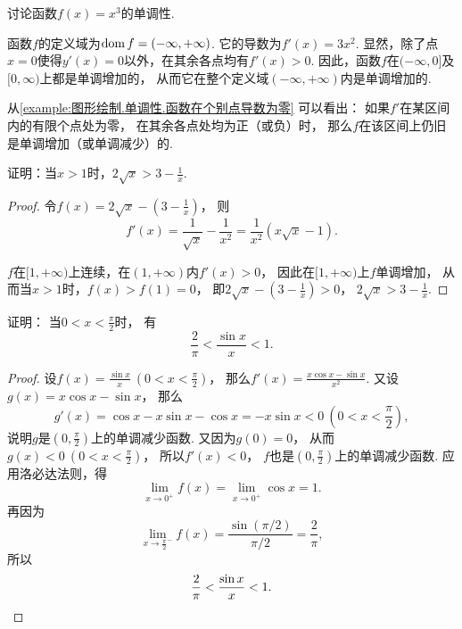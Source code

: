 \begin{example}\label{example:图形绘制.单调性.函数在个别点导数为零}
讨论函数\(f(x) = x^3\)的单调性.
\begin{solution}
函数\(f\)的定义域为\(\operatorname{dom} f = (-\infty,+\infty)\).
它的导数为\(f'(x) = 3x^2\).
显然，除了点\(x=0\)使得\(y'(x) = 0\)以外，在其余各点均有\(f'(x)>0\).
因此，函数\(f\)在\((-\infty,0]\)及\([0,\infty)\)上都是单调增加的，
从而它在整个定义域\((-\infty,+\infty)\)内是单调增加的.
\end{solution}
\end{example}
\begin{remark}
从\cref{example:图形绘制.单调性.函数在个别点导数为零} 可以看出：
如果\(f'\)在某区间内的有限个点处为零，
在其余各点处均为正（或负）时，
那么\(f\)在该区间上仍旧是单调增加（或单调减少）的.
\end{remark}

\begin{example}
证明：当\(x > 1\)时，\(2 \sqrt{x} > 3 - \frac{1}{x}\).
\begin{proof}
令\(f(x) = 2 \sqrt{x} - \left(3 - \frac{1}{x}\right)\)，
则\[
	f'(x) = \frac{1}{\sqrt{x}} - \frac{1}{x^2}
	= \frac{1}{x^2} (x \sqrt{x} - 1).
\]

\(f\)在\([1,+\infty)\)上连续，在\((1,+\infty)\)内\(f'(x) > 0\)，
因此在\([1,+\infty)\)上\(f\)单调增加，
从而当\(x > 1\)时，\(f(x) > f(1) = 0\)，
即\(2 \sqrt{x} - \left(3 - \frac{1}{x}\right) > 0\)，
\(2 \sqrt{x} > 3 - \frac{1}{x}\).
\end{proof}
\end{example}

\begin{example}
证明：
当\(0<x<\frac\pi2\)时，
有\begin{equation}\label{equation:微分中值定理.若尔当不等式}
	\frac2\pi < \frac{\sin x}{x} < 1.
\end{equation}
\begin{proof}
设\(f(x) = \frac{\sin x}{x}\ (0<x<\frac\pi2)\)，
那么\(f'(x) = \frac{x\cos x - \sin x}{x^2}\).
又设\(g(x) = x \cos x - \sin x\)，
那么\[
	g'(x) = \cos x - x \sin x - \cos x = -x \sin x < 0\ (0<x<\frac\pi2),
\]
说明\(g\)是\((0,\frac\pi2)\)上的单调减少函数.
又因为\(g(0) = 0\)，
从而\(g(x) < 0\ (0<x<\frac\pi2)\)，
所以\(f'(x) < 0\)，
\(f\)也是\((0,\frac\pi2)\)上的单调减少函数.
应用洛必达法则，得\[
	\lim_{x\to0^+} f(x)
	= \lim_{x\to0^+} \cos x
	= 1.
\]
再因为\[
	\lim_{x\to\frac\pi2^-} f(x)
	= \frac{\sin(\pi/2)}{\pi/2}
	= \frac2\pi,
\]
所以\[
	\frac2\pi < \frac{\sin x}{x} < 1.
	\qedhere
\]
\end{proof}
\end{example}

